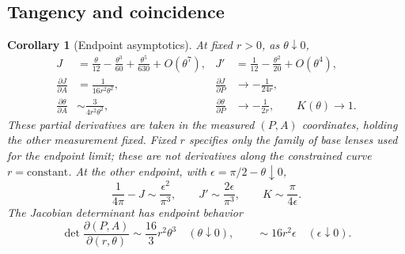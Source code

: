 \documentclass[11pt,a4paper]{article}
\newtheorem{corollary}[theorem]{Corollary}
\theoremstyle{definition}
\begin{document}
\subsection{Tangency and coincidence}
\begin{corollary}[Endpoint asymptotics]\label{cor:endpoints}
At fixed \(r>0\), as \(\theta\downarrow0\),
\begin{align}
 J&=\frac{\theta}{12}-\frac{\theta^3}{60}
       +\frac{\theta^5}{630}+O(\theta^7),
 &J'&=\frac1{12}-\frac{\theta^2}{20}+O(\theta^4),\label{eq:Jtangent}\\
 \frac{\partial J}{\partial A}
 &=\frac1{16r^2\theta^2},
 &\frac{\partial J}{\partial P}&\longrightarrow-\frac1{24r},\label{eq:Jcoeff}\\
 \frac{\partial\theta}{\partial A}
 &\sim\frac3{4r^2\theta^2},
 &\frac{\partial\theta}{\partial P}&\longrightarrow-\frac1{2r},
 \qquad K(\theta)\longrightarrow1.\label{eq:thetacoeff}
\end{align}
These partial derivatives are taken in the measured \((P,A)\) coordinates, holding the other measurement fixed. Fixed \(r\) specifies only the family of base lenses used for the endpoint limit; these are not derivatives along the constrained curve \(r=\mathrm{constant}\). At the other endpoint, with \(\epsilon=\pi/2-\theta\downarrow0\),
\begin{equation}\label{eq:diskasymp}
 \frac1{4\pi}-J\sim\frac{\epsilon^2}{\pi^3},
 \qquad J'\sim\frac{2\epsilon}{\pi^3},
 \qquad K\sim\frac{\pi}{4\epsilon}.
\end{equation}
The Jacobian determinant has endpoint behavior
\begin{equation}\label{eq:detasymp}
 \det\frac{\partial(P,A)}{\partial(r,\theta)}
 \sim\frac{16}{3}r^2\theta^3\quad(\theta\downarrow0),
 \qquad
 \sim16r^2\epsilon\quad(\epsilon\downarrow0).
\end{equation}
\end{corollary}
\end{document}
